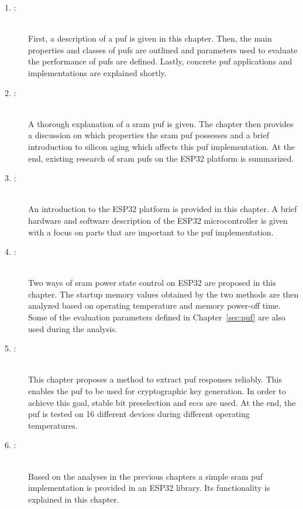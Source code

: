 \begin{description}
    \item[1. :] \hfill \\
        First, a description of a \gls{puf} is given in this chapter. Then, the main properties and classes of \glspl{puf} are outlined and parameters used to evaluate the performance of \glspl{puf} are defined. Lastly, concrete \gls{puf} applications and implementations are explained shortly.
    \item[2. :] \hfill \\
        A thorough explanation of a \gls{sram} \gls{puf} is given. The chapter then provides a discussion on which properties the \gls{sram} \gls{puf} possesses and a brief introduction to silicon aging which affects this \gls{puf} implementation. At the end, existing research of \gls{sram} \glspl{puf} on the ESP32 platform is summarized.
    \item[3. :] \hfill \\
        An introduction to the ESP32 platform is provided in this chapter. A brief hardware and software description of the ESP32 microcontroller is given with a focus on parts that are important to the \gls{puf} implementation.
    \item[4. :] \hfill \\
        Two ways of \gls{sram} power state control on ESP32 are proposed in this chapter. The startup memory values obtained by the two methods are then analyzed based on operating temperature and memory power-off time. Some of the evaluation parameters defined in Chapter~\ref{sec:puf} are also used during the analysis.
    \item[5. :] \hfill \\
        This chapter proposes a method to extract \gls{puf} responses reliably. This enables the \gls{puf} to be used for cryptographic key generation. In order to achieve this goal, stable bit preselection and \glspl{ecc} are used. At the end, the \gls{puf} is tested on 16 different devices during different operating temperatures.
    \item[6. :] \hfill \\
        Based on the analyses in the previous chapters a simple \gls{sram} \gls{puf} implementation is provided in an ESP32 library. Its functionality is explained in this chapter.
\end{description}


